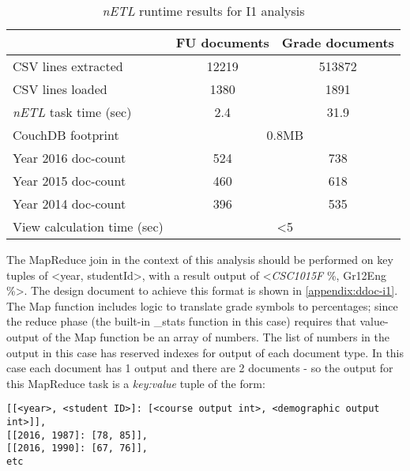 \begin{table}[]
    \centering
    \caption{\textit{nETL} runtime results for I1 analysis}
    \label{i1-results}
    \begin{tabular}{lcc}
                                      & FU documents                    & Grade documents \\ \hline
        CSV lines extracted           & 12219                           & 513872          \\
        CSV lines loaded              & 1380                            & 1891            \\
        \textit{nETL} task time (sec) & 2.4                             & 31.9            \\
        CouchDB footprint             & \multicolumn{2}{c}{0.8MB}                         \\
        Year 2016 doc-count           & 524                             & 738             \\
        Year 2015 doc-count           & 460                             & 618             \\
        Year 2014 doc-count           & 396                             & 535             \\
        View calculation time (sec)   & \multicolumn{2}{c}{\textless 5}                   \\
    \end{tabular}
\end{table}

The MapReduce join in the context of this analysis should be performed on key tuples of <year, studentId>, with a result output of <\textit{CSC1015F} \%, Gr12Eng \%>. The design document to achieve this format is shown in \ref{appendix:ddoc-i1}. The Map function includes logic to translate grade symbols to percentages; since the reduce phase (the built-in \_stats function in this case) requires that value-output of the Map function be an array of numbers. The list of numbers in the output in this case has reserved indexes for output of each document type. In this case each document has 1 output and there are 2 documents - so the output for this MapReduce task is a \textit{key:value} tuple of the form:

\begin{verbatim}
[[<year>, <student ID>]: [<course output int>, <demographic output int>]],
[[2016, 1987]: [78, 85]],
[[2016, 1990]: [67, 76]],
etc
\end{verbatim}

